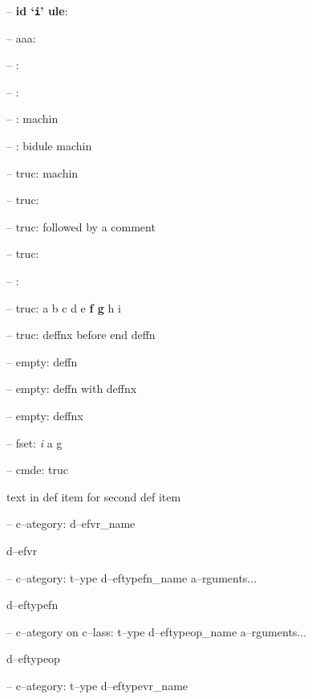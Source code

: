 \documentclass{book}
\begin{document}
%
\hbox{}-- \textbf{id `\texttt{i}' ule}: 



\hbox{}-- aaa: 


\hbox{}-- : 


\hbox{}-- : 


\hbox{}-- : machin


%
\hbox{}-- : bidule machin


%
\hbox{}-- truc: machin


%
\hbox{}-- truc: 


\hbox{}-- truc: followed by a comment


%
\hbox{}-- truc: 


\hbox{}-- : 


\hbox{}-- truc: a b c d e \textbf{f g} h i


%
\hbox{}-- truc: deffnx before end deffn


%

\hbox{}-- empty: deffn


%

\hbox{}-- empty: deffn with deffnx


%
\hbox{}-- empty: deffnx


%

\hbox{}-- fset: \emph{i} a g


%
\hbox{}-- cmde: truc 


%
text in def item for second def item

\hbox{}-- c--ategory: d--efvr\_name


%
d--efvr

\hbox{}-- c--ategory: t--ype d--eftypefn\_name a--rguments...


%
d--eftypefn

\hbox{}-- c--ategory on c--lass: t--ype d--eftypeop\_name a--rguments...


%
d--eftypeop

\hbox{}-- c--ategory: t--ype d--eftypevr\_name
\end{document}
